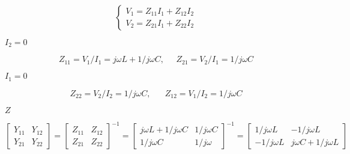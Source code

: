 {\newpage\clearpage
{}%
\begin{displaymath} \left\{ \begin{array}{l} V_1=Z_{11}I_1+Z_{12}I_2 \\
	V_2=Z_{21}I_1+Z_{22}I_2 \end{array} \right.
\end{displaymath}%
\lthtmldisplayZ
\lthtmlcheckvsize\clearpage}

{\newpage\clearpage
{}%
$I_2=0$%
\lthtmlinlinemathZ
\lthtmlcheckvsize\clearpage}

{\newpage\clearpage
{}%
\begin{displaymath} Z_{11}=V_1/I_1=j\omega L+1/j\omega C,\;\;\;\;\;Z_{21}=V_2/I_1=1/j\omega C \end{displaymath}%
\lthtmldisplayZ
\lthtmlcheckvsize\clearpage}

{\newpage\clearpage
{}%
$I_1=0$%
\lthtmlinlinemathZ
\lthtmlcheckvsize\clearpage}

{\newpage\clearpage
{}%
\begin{displaymath} Z_{22}=V_2/I_2=1/j\omega C,\;\;\;\;\;\;Z_{12}=V_1/I_2=1/j\omega C \end{displaymath}%
\lthtmldisplayZ
\lthtmlcheckvsize\clearpage}

{\newpage\clearpage
{}%
$Z$%
\lthtmlinlinemathZ
\lthtmlcheckvsize\clearpage}

{\newpage\clearpage
{}%
\begin{displaymath} \left[\begin{array}{cc}Y_{11}&Y_{12}\\Y_{21}&Y_{22}\end{array}\right]
  =\left[\begin{array}{cc}Z_{11}&Z_{12}\\Z_{21}&Z_{22}\end{array}\right]^{-1}
  =\left[\begin{array}{cc}j\omega L+1/j\omega C & 1/j\omega C\\
	1/j\omega C & 1/j\omega \end{array}\right]^{-1}
  =\left[\begin{array}{cc}1/j\omega L & -1/j\omega L\\
	-1/j\omega L & j\omega C+1/j\omega L\end{array}\right] \end{displaymath}%
\lthtmldisplayZ
\lthtmlcheckvsize\clearpage}


